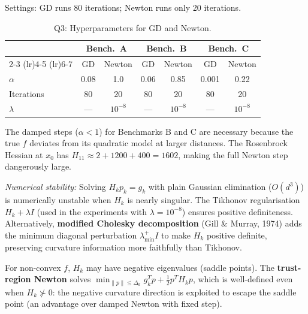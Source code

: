 \documentclass[11pt,a4paper]{article}
\theoremstyle{definition}
\begin{document}
Settings: GD runs 80 iterations; Newton runs only 20 iterations.

\begin{table}[H]
\centering
\caption{Q3: Hyperparameters for GD and Newton.}
\label{tab:q3_params}
\begin{tabular}{lcccccc}
\toprule
 & \multicolumn{2}{c}{\textbf{Bench.\ A}} & \multicolumn{2}{c}{\textbf{Bench.\ B}} & \multicolumn{2}{c}{\textbf{Bench.\ C}} \\
\cmidrule(lr){2-3} \cmidrule(lr){4-5} \cmidrule(lr){6-7}
 & GD & Newton & GD & Newton & GD & Newton \\
\midrule
$\alpha$ & 0.08 & 1.0 & 0.06 & 0.85 & 0.001 & 0.22 \\
Iterations & 80 & 20 & 80 & 20 & 80 & 20 \\
$\lambda$ & --- & $10^{-8}$ & --- & $10^{-8}$ & --- & $10^{-8}$ \\
\bottomrule
\end{tabular}
\end{table}

The damped steps ($\alpha < 1$) for Benchmarks B and C are necessary because the true $f$ deviates from its quadratic model at larger distances. The Rosenbrock Hessian at $x_0$ has $H_{11} \approx 2 + 1200 + 400 = 1602$, making the full Newton step dangerously large.

\noindent\textit{Numerical stability:} Solving $H_k p_k = g_k$ with plain Gaussian elimination ($O(d^3)$) is numerically unstable when $H_k$ is nearly singular. The Tikhonov regularisation $H_k + \lambda I$ (used in the experiments with $\lambda = 10^{-8}$) ensures positive definiteness. Alternatively, \textbf{modified Cholesky decomposition} (Gill \& Murray, 1974) adds the minimum diagonal perturbation $\lambda_{\min}^+ I$ to make $H_k$ positive definite, preserving curvature information more faithfully than Tikhonov.

For non-convex $f$, $H_k$ may have negative eigenvalues (saddle points). The \textbf{trust-region Newton} solves $\min_{\|p\| \leq \Delta_k} g_k^T p + \frac{1}{2}p^T H_k p$, which is well-defined even when $H_k \not\succ 0$: the negative curvature direction is exploited to escape the saddle point (an advantage over damped Newton with fixed step).
\end{document}
